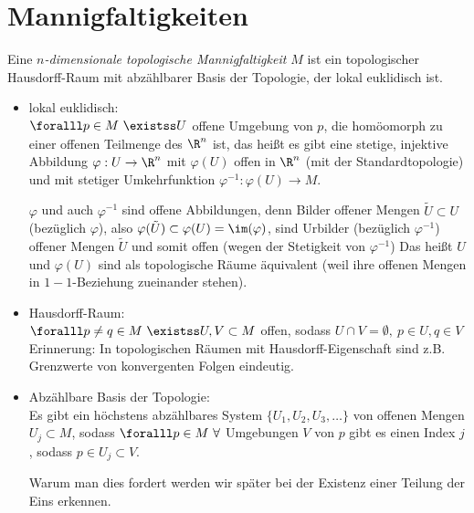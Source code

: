 \chapter{Mannigfaltigkeiten}\lecture

\begin{defn}\label{def1_1}
	Eine \emph{$n$-dimensionale topologische Mannigfaltigkeit $M$} ist ein topologischer Hausdorff-Raum mit abzählbarer Basis der Topologie, der lokal euklidisch ist.
	\begin{itemize}
		\item lokal euklidisch:\\
			$ \foralll p \in M\ \existss U $ offene Umgebung von $p$, die homöomorph zu einer offenen Teilmenge des $\R^n$ ist, das heißt es gibt eine stetige, injektive Abbildung $ \varphi: U \to \R^n $ mit $ \varphi(U) $ offen in $\R^n$ (mit der Standardtopologie) und mit stetiger Umkehrfunktion $\varphi^{-1}: \varphi(U) \to M$.
			\begin{rem*}
				$\varphi$ und auch $\varphi^{-1}$ sind offene Abbildungen, denn Bilder offener Mengen $ \tilde{U} \subset U $ (bezüglich $\varphi$), also $ \varphi(\tilde{U}) \subset \varphi(U) = \im(\varphi) $, sind Urbilder (bezüglich $\varphi^{-1}$) offener Mengen $\tilde{U}$ und somit offen (wegen der Stetigkeit von $\varphi^{-1}$)
				Das heißt $U$ und $\varphi(U)$ sind als topologische Räume äquivalent (weil ihre offenen Mengen in $1-1$-Beziehung zueinander stehen).
			\end{rem*}
		\item Hausdorff-Raum:\\
			$ \foralll p \neq q \in M \ \existss U,V \subset M $ offen, sodass $ U \cap V = \emptyset,\ p \in U, q \in V $
			\incfig{1_1 hausdorff}{6cm}
			Erinnerung: In topologischen Räumen mit Hausdorff-Eigenschaft sind z.B. Grenzwerte von konvergenten Folgen eindeutig.
		\item Abzählbare Basis der Topologie:\\
			Es gibt ein höchstens abzählbares System $ \{U_1,U_2,U_3,\dots\} $ von offenen Mengen $ U_j \subset M $, sodass $ \foralll p \in M \ \forall $ Umgebungen $V$ von $p$ gibt es einen Index $j$, sodass $ p \in U_j \subset V $.
			\begin{rem*}
				Warum man dies fordert werden wir später bei der Existenz einer Teilung der Eins erkennen.
			\end{rem*}
	\end{itemize}

\end{defn}
